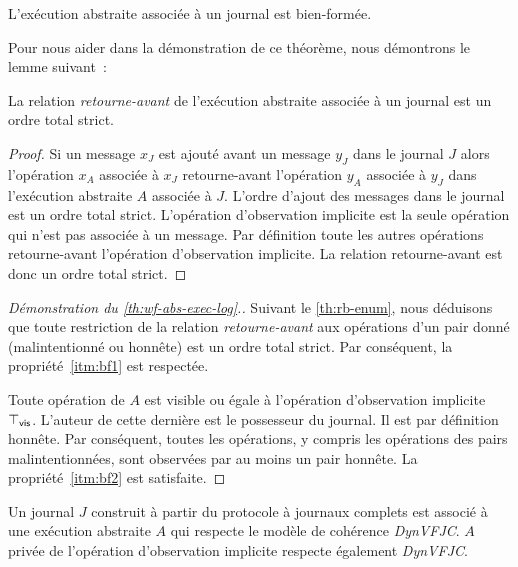 \begin{theorem}\label{th:wf-abs-exec-log}
L'exécution abstraite associée à un journal est bien-formée.
\end{theorem}

Pour nous aider dans la démonstration de ce théorème, nous démontrons le lemme suivant~:

\begin{lemma}\label{th:rb-enum}
La relation \emph{retourne-avant} de l'exécution abstraite associée à un journal est un ordre total strict.
\end{lemma}
\begin{proof}
Si un message $x_J$ est ajouté avant un message $y_J$ dans le journal $J$ alors l'opération $x_A$ associée à $x_J$ retourne-avant l'opération $y_A$ associée à $y_J$ dans l'exécution abstraite $A$ associée à $J$.
L'ordre d'ajout des messages dans le journal est un ordre total strict.
L'opération d'observation implicite est la seule opération qui n'est pas associée à un message.
Par définition toute les autres opérations retourne-avant l'opération d'observation implicite.
La relation retourne-avant est donc un ordre total strict.
\end{proof}

\begin{proof}[Démonstration du \autoref{th:wf-abs-exec-log}.]
Suivant le \autoref{th:rb-enum}, nous déduisons que toute restriction de la relation \emph{retourne-avant} aux opérations d'un pair donné (malintentionné ou honnête) est un ordre total strict.
Par conséquent, la propriété~\ref{itm:bf1} est respectée.

Toute opération de $A$ est visible ou égale à l'opération d'observation implicite $\top_{\operatorname{\mathsf{vis}}}$.
L'auteur de cette dernière est le possesseur du journal.
Il est par définition honnête.
Par conséquent, toutes les opérations, y compris les opérations des pairs malintentionnées, sont observées par au moins un pair honnête.
La propriété~\ref{itm:bf2} est satisfaite.
\end{proof}


\begin{theorem}\label{th:abs-exec-full-log-consistency}
Un journal $J$ construit à partir du protocole à journaux complets est associé à une exécution abstraite $A$ qui respecte le modèle de cohérence \emph{DynVFJC}.
$A$ privée de l'opération d'observation implicite respecte également \emph{DynVFJC}.
\end{theorem}

